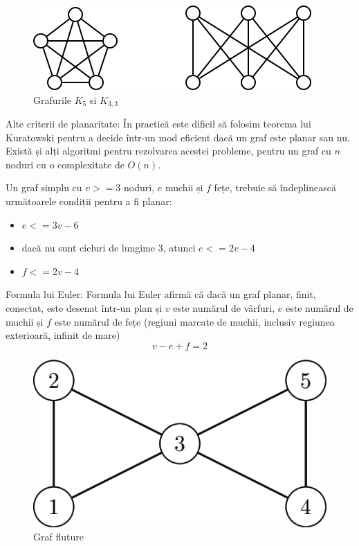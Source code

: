 \begin{figure}[H]
    \begin{center}
        \includegraphics[scale=0.7]{imagini/graf/notplanar.png}        
    \end{center}
    \caption{Grafurile \(K_5\) si \(K_{3,3}\) \protect\footnotemark}
    \label{fig:k5k33}
\end{figure}


Alte criterii de planaritate:\newline
În practică este dificil să folosim teorema lui Kuratowski pentru a decide într-un mod eficient dacă un graf este planar sau nu. 
Există și alți algoritmi pentru rezolvarea acestei probleme, pentru un graf cu \(n\) noduri cu o complexitate de \(O(n)\).

Un graf simplu  cu \(v>=3\) noduri, \(e\) muchii și \(f\) fețe, trebuie să îndeplinească următoarele condiții pentru a fi planar:
\begin{itemize}
    \item  \(e<=3v-6\)
    \item  dacă nu sunt cicluri de lungime \(3\), atunci \(e<=2v-4\) 
    \item  \(f<=2v-4\)
\end{itemize}

Formula lui Euler: \newline
Formula lui Euler afirmă că dacă un graf planar, finit, conectat, este desenat într-un plan și \(v\) este numărul de vârfuri, 
\(e\) este numărul de muchii și \(f\) este numărul de fețe (regiuni marcate de muchii, inclusiv regiunea exterioară, infinit de mare)
\[v-e+f=2\]

\begin{figure}[H]
    \begin{center}
        \includegraphics[scale=0.5]{imagini/graf/butterfly.png}
        \caption{Graf fluture \protect\footnotemark}
        \label{fig:fluture}
    \end{center}    
\end{figure}


